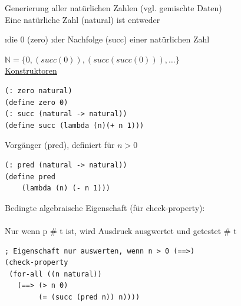 Generierung aller natürlichen Zahlen (vgl. gemischte Daten)\\
Eine natürliche Zahl (natural) ist entweder 
\begin{enumerate}[-]
\i die 0 (zero)
\i der Nachfolge (succ) einer natürlichen Zahl
\end{enumerate}

$\mathbb{N} = \{0, (succ(0)), (succ(succ(0))), \ldots \} $\\
\uline{Konstruktoren}\\
\begin{lstlisting}
(: zero natural)
(define zero 0)
(: succ (natural -> natural))
(define succ (lambda (n)(+ n 1)))
\end{lstlisting}
Vorgänger (pred), definiert für $n > 0$
\begin{lstlisting}
(: pred (natural -> natural))
(define pred
	(lambda (n) (- n 1)))
\end{lstlisting}
Bedingte algebraische Eigenschaft (für check-property):\\
\\
Nur wenn \auf p \zu \eval \# t ist, wird Ausdruck \argt{} ausgwertet und getestet \argt{} \eval \# t
\begin{lstlisting}[frame =single]
; Eigenschaft nur auswerten, wenn n > 0 (==>)
(check-property
 (for-all ((n natural))
   (==> (> n 0)   
        (= (succ (pred n)) n))))
\end{lstlisting}

